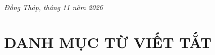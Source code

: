 \documentclass[12pt,a4paper]{report}
\begin{document}
\begin{titlepage}
\begin{center}
    \vfill
    \textit{\large Đồng Tháp, tháng 11 năm 2026}\\[0.3cm]
\end{center}
\end{titlepage}

\setcounter{page}{1}

\tableofcontents
\newpage

\chapter*{DANH MỤC TỪ VIẾT TẮT}
\vspace*{-1.0cm}
\end{document}

